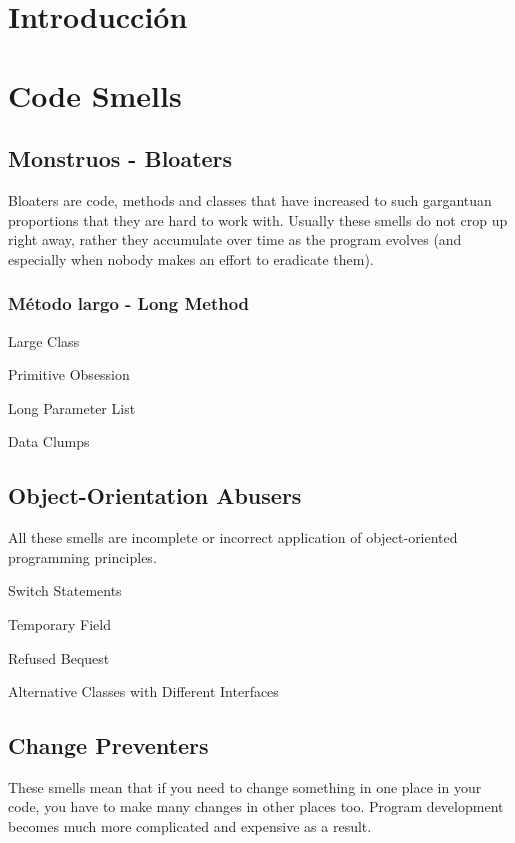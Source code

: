 \documentclass[11pt,a4paper,oneside]{book}
\begin{document}
\tableofcontents %
 
\chapter{Introducción}

\chapter{Code Smells}

\section{Monstruos - Bloaters}

Bloaters are code, methods and classes that have increased to such gargantuan proportions that they are hard to work with. Usually these smells do not crop up right away, rather they accumulate over time as the program evolves (and especially when nobody makes an effort to eradicate them).

\subsection{Método largo -   Long Method}
    Large Class
    
    
    Primitive Obsession
    
    Long Parameter List
    
    Data Clumps




\section{Object-Orientation Abusers}

All these smells are incomplete or incorrect application of object-oriented programming principles.

    Switch Statements
    
    Temporary Field

    Refused Bequest
    
    Alternative Classes with Different Interfaces





\section{Change Preventers}

These smells mean that if you need to change something in one place in your code, you have to make many changes in other places too. Program development becomes much more complicated and expensive as a result.
\end{document}
